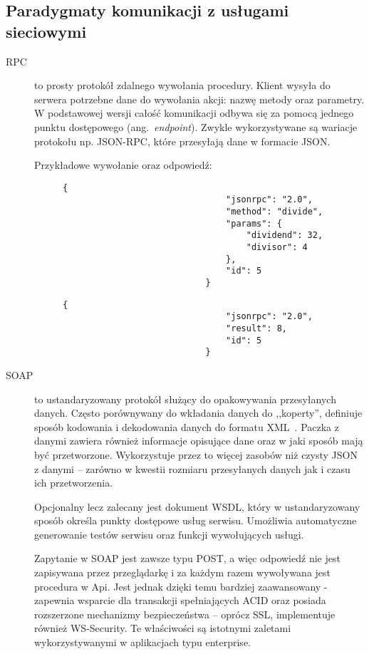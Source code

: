	\subsection{Paradygmaty komunikacji z usługami sieciowymi}
		\begin{description}
			\item[RPC] to prosty protokół zdalnego wywołania procedury.
				Klient wysyła do serwera potrzebne dane do wywołania akcji: nazwę metody oraz parametry.
				W podstawowej wersji całość komunikacji odbywa się za pomocą jednego punktu dostępowego (ang.\ \emph{endpoint}).
				Zwykle wykorzystywane są wariacje protokołu np. JSON-RPC, które przesyłają dane w formacie JSON.

				Przykładowe wywołanie oraz odpowiedź:
				\begin{figure}[!htb]
					\centering
					\begin{minipage}{.5\textwidth}
						\begin{lstlisting}[label=lst:rpcReq]
							{
								"jsonrpc": "2.0",
								"method": "divide",
								"params": {
									"dividend": 32,
									"divisor": 4
								},
								"id": 5
							}
						\end{lstlisting}	
					\end{minipage}%
					\begin{minipage}{0.5\textwidth}
						\begin{lstlisting}[label=lst:rpcRes]
							{
								"jsonrpc": "2.0",
								"result": 8,
								"id": 5
							}
						\end{lstlisting}
					\end{minipage}
				\end{figure}

			\item[SOAP] to ustandaryzowany protokół służący do opakowywania przesyłanych danych. 
				Często porównywany do wkładania danych do ,,koperty'', definiuje sposób kodowania i dekodowania danych do formatu XML~\cite{SOAP}.
				Paczka z danymi zawiera również informacje opisujące dane oraz w jaki sposób mają być przetworzone.
				Wykorzystuje przez to więcej zasobów niż czysty JSON z danymi -- zarówno w kwestii rozmiaru przesyłanych danych jak i czasu ich przetworzenia.
				
				Opcjonalny lecz zalecany jest dokument WSDL, który w ustandaryzowany sposób określa punkty dostępowe usług serwisu.
				Umożliwia automatyczne generowanie testów serwisu oraz funkcji wywołujących usługi.
				
				Zapytanie w SOAP jest zawsze typu POST, a więc odpowiedź nie jest zapisywana przez przeglądarkę i za każdym razem wywoływana jest procedura w Api.
				Jest jednak dzięki temu bardziej zaawansowany - zapewnia wsparcie dla transakcji spełniających ACID
				oraz posiada rozszerzone mechanizmy bezpieczeństwa -- oprócz SSL, implementuje również WS-Security.
				Te właściwości są istotnymi zaletami wykorzystywanymi w aplikacjach typu enterprise.


\end{description}
